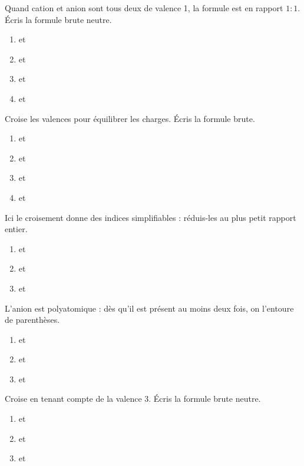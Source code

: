 \documentclass[11pt,a4paper]{article}
\begin{document}
\begin{exo}
Quand cation et anion sont tous deux de valence 1, la formule est en rapport $1:1$. Écris la formule brute
neutre.
\begin{enumerate}[label=\alph*)]
  \item {} et 
  \item {} et 
  \item {} et 
  \item {} et 
\end{enumerate}
\end{exo}

\begin{exo}
Croise les valences pour équilibrer les charges. Écris la formule brute.
\begin{enumerate}[label=\alph*)]
  \item {} et 
  \item {} et 
  \item {} et 
  \item {} et 
\end{enumerate}
\end{exo}

\begin{exo}
Ici le croisement donne des indices simplifiables : réduis-les au plus petit rapport entier.
\begin{enumerate}[label=\alph*)]
  \item {} et 
  \item {} et 
  \item {} et 
\end{enumerate}
\end{exo}

\begin{exo}
L'anion est polyatomique : dès qu'il est présent au moins deux fois, on l'entoure de parenthèses.
\begin{enumerate}[label=\alph*)]
  \item {} et 
  \item {} et 
  \item {} et 
\end{enumerate}
\end{exo}

\begin{exo}
Croise en tenant compte de la valence 3. Écris la formule brute neutre.
\begin{enumerate}[label=\alph*)]
  \item {} et 
  \item {} et 
  \item {} et 
\end{enumerate}
\end{exo}
\end{document}
